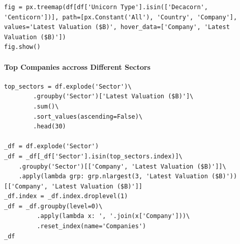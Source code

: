 \documentclass[a4paper,12pt]{article}
\begin{document}
\newpage

\begin{verbatim}
fig = px.treemap(df[df['Unicorn Type'].isin(['Decacorn', 'Centicorn'])], path=[px.Constant('All'), 'Country', 'Company'], values='Latest Valuation ($B)', hover_data=['Company', 'Latest Valuation ($B)'])
fig.show()
\end{verbatim}
\paragraph{Top Companies accross Different Sectors}
\label{sec:orgcaf9f2e}

\begin{verbatim}
top_sectors = df.explode('Sector')\
        .groupby('Sector')['Latest Valuation ($B)']\
        .sum()\
        .sort_values(ascending=False)\
        .head(30)

_df = df.explode('Sector')
_df = _df[_df['Sector'].isin(top_sectors.index)]\
    .groupby('Sector')[['Company', 'Latest Valuation ($B)']]\
    .apply(lambda grp: grp.nlargest(3, 'Latest Valuation ($B)'))[['Company', 'Latest Valuation ($B)']]
_df.index = _df.index.droplevel(1)
_df = _df.groupby(level=0)\
         .apply(lambda x: ', '.join(x['Company']))\
         .reset_index(name='Companies')
_df
\end{verbatim}
\end{document}

